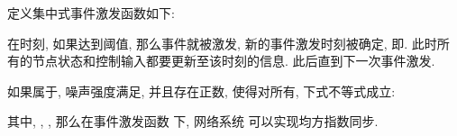         定义集中式事件激发函数如下:
        \begin{comment}\label{trig-f}
            g^c(t)=(1+\epsilon)\|\delta(t)\|^2+\epsilon\|\hat{s}(t)\|^2-\frac{\xi^2\underline{q}^2}{4(\bar{\lambda}^2+2\epsilon)c^2\bar{q}^2\bar{\gamma}^2}\|e(t)\|^2
        \end{comment}
        \begin{rem}
        在时刻, 如果达到阈值, 那么事件就被激发, 新的事件激发时刻被确定, 即. 此时所有的节点状态和控制输入都要更新至该时刻的信息. 此后直到下一次事件激发.
        \end{rem}
        \begin{thm}\label{thm:cen}
            如果属于, 噪声强度满足, 并且存在正数, 使得对所有, 下式不等式成立:
            \begin{comment}\label{ce-condiction}
            \left\{
            \begin{commented}
                  &(\bar{\delta}+\chi_u)I_N-c\underline{\gamma}(L(u)+\epsilon D(u))\leq0,\\
                  &\pi_v-a_u\leq0, \quad \text{if}\quad v\neq u, v\in S^u_2,\\
                  &\pi_v-a_u\geq0, \quad \text{if} \quad v= u, v\in S^u_2,
            \end{commented}
            \right.
            \end{comment}
           其中, , , 那么在事件激发函数  下, 网络系统  可以实现均方指数同步.
        \end{thm}
